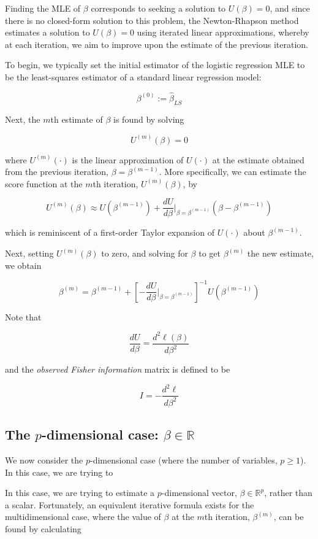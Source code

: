 Finding the MLE of $\beta$ corresponds to seeking a solution to $U(\beta) = 0$, and since there is no closed-form solution to this problem, the Newton-Rhapson method estimates a solution to $U(\beta) = 0$ using iterated linear approximations, whereby at each iteration, we aim to improve upon the estimate of the previous iteration. 

To begin, we typically set the initial estimator of the logistic regression MLE to be the least-squares estimator of a standard linear regression model:

$$\beta^{(0)} := \hat{\beta}_{LS}$$

Next, the $m$th estimate of $\beta$ is found by solving

$$U^{(m)}(\beta) = 0$$

where $U^{(m)}(\cdot)$ is the linear approximation of $U(\cdot)$ at the estimate obtained from the previous iteration, $\beta = \beta^{(m-1)}$. More specifically, we can estimate the score function at the $m$th iteration, $U^{(m)}(\beta)$, by 

$$U^{(m)}(\beta) \approx U\left( \beta^{(m-1)}\right) + \frac{dU}{d\beta} \Big\vert_{\beta = \beta^{(m-1)}} \left( \beta - \beta^{(m-1)} \right)$$

which is reminiscent of a first-order Taylor expansion of $U(\cdot)$ about $\beta^{(m-1)}$. 

Next, setting $U^{(m)}(\beta)$ to zero, and solving for $\beta$ to get $\beta^{(m)}$ the new estimate, we obtain

$$\beta^{(m)} = \beta^{(m-1)} + \left[ - \frac{dU}{d\beta} \Big\vert_{\beta = \beta^{(m-1)}} \right]^{-1} U\left(\beta^{(m-1)}\right)$$


Note that

$$\frac{dU}{d\beta} = \frac{d^2 \ell(\beta)}{d\beta^2}$$

and the \textit{observed Fisher information} matrix is defined to be

$$I = - \frac{d^2 \ell}{d\beta^2}$$

\subsection*{The $p$-dimensional case: $\beta \in \mathbb{R}$}

We now consider the $p$-dimensional case (where the number of variables, $p \geq 1$). In this case, we are trying to 

In this case, we are trying to estimate a $p$-dimensional vector, $\beta \in \mathbb{R}^p$, rather than a scalar. Fortunately, an equivalent iterative formula exists for the multidimensional case, where the value of $\beta$ at the $m$th iteration, $\beta^{(m)}$, can be found by calculating

